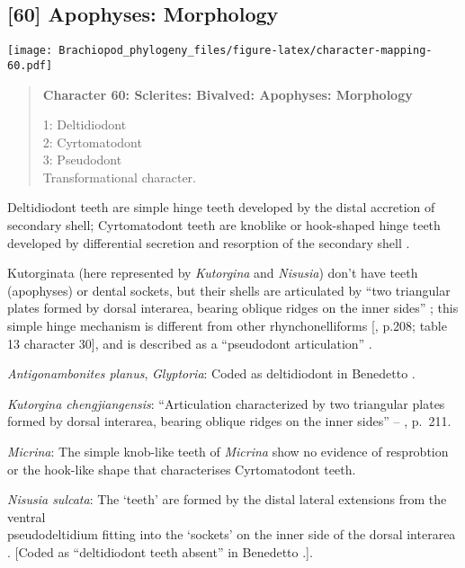 \documentclass[openany]{book}
\theoremstyle{definition}
\theoremstyle{definition}
\theoremstyle{definition}
\theoremstyle{remark}
\begin{document}
\subsection*{{[}60{]} Apophyses: Morphology}\label{apophyses-morphology}

\texttt{[image: Brachiopod\_phylogeny\_files/figure-latex/character-mapping-60.pdf]}

\begin{quote}
\textbf{Character 60: Sclerites: Bivalved: Apophyses: Morphology}

1: Deltidiodont\\
2: Cyrtomatodont\\
3: Pseudodont\\
Transformational character.
\end{quote}

Deltidiodont teeth are simple hinge teeth developed by the distal
accretion of secondary shell; Cyrtomatodont teeth are knoblike or
hook-shaped hinge teeth developed by differential secretion and
resorption of the secondary shell \citep[fig. 322
in][]{Williams1997Introduction}.

Kutorginata (here represented by \emph{Kutorgina} and \emph{Nisusia})
don't have teeth (apophyses) or dental sockets, but their shells are
articulated by ``two triangular plates formed by dorsal interarea,
bearing oblique ridges on the inner sides''
\citep[p.~211]{Williams2000LinguliformeaCraniiformea}; this simple hinge
mechanism is different from other rhynchonelliforms
{[}\citet{Williams2000LinguliformeaCraniiformea}, p.208; table 13
character 30{]}, and is described as a ``pseudodont articulation''
\citep{Holmer2018Evolutionarysignificance}.

\hypertarget{Antigonambonites_planus-coding-60}{}
\emph{Antigonambonites planus}, \emph{Glyptoria}: Coded as deltidiodont
in Benedetto \citeyearpar{Benedetto2009iChaniella}.

\hypertarget{Kutorgina_chengjiangensis-coding-60}{}
\emph{Kutorgina chengjiangensis}: ``Articulation characterized by two
triangular plates formed by dorsal interarea, bearing oblique ridges on
the inner sides'' -- \citet{Williams2000LinguliformeaCraniiformea},
p.~211.

\hypertarget{Micrina-coding-60}{}
\emph{Micrina}: The simple knob-like teeth of \emph{Micrina} show no
evidence of resprobtion or the hook-like shape that characterises
Cyrtomatodont teeth.

\hypertarget{Nisusia_sulcata-coding-60}{}
\emph{Nisusia sulcata}: The `teeth' are formed by the distal lateral
extensions from the ventral\\
pseudodeltidium fitting into the `sockets' on the inner side of the
dorsal interarea \citep{Holmer2018Evolutionarysignificance}. {[}Coded as
``deltidiodont teeth absent'' in Benedetto
\citeyearpar{Benedetto2009iChaniella}.{]}.
\end{document}
